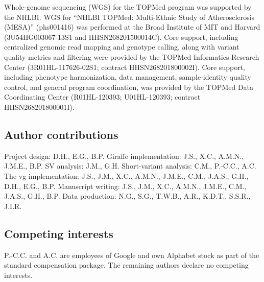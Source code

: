 \documentclass[11pt]{ucscthesis}
\begin{document}
Whole-genome sequencing (WGS) for the TOPMed program was supported by the NHLBI.
WGS for “NHLBI TOPMed: Multi-Ethnic Study of Atherosclerosis (MESA)” (phs001416) was performed at the Broad Institute of MIT and Harvard (3U54HG003067-13S1 and HHSN268201500014C).
Core support, including centralized genomic read mapping and genotype calling, along with variant quality metrics and filtering were provided by the TOPMed Informatics Research Center (3R01HL-117626-02S1; contract HHSN268201800002I).
Core support, including phenotype harmonization, data management, sample-identity quality control, and general program coordination, was provided by the TOPMed Data Coordinating Center (R01HL-120393; U01HL-120393; contract \\ HHSN268201800001I).

\subsection{Author contributions}
Project design: D.H., E.G., B.P. Giraffe implementation: J.S., X.C., A.M.N., J.M.E., B.P. SV analysis: J.M., G.H. Short-variant analysis: C.M., P.-C.C., A.C. The vg implementation: J.S., J.M., X.C., A.M.N., J.M.E., C.M., J.A.S., G.H., D.H., E.G., B.P. Manuscript writing: J.S., J.M., X.C., A.M.N., J.M.E., C.M., J.A.S., G.H., B.P. Data production: N.G., S.G., T.W.B., A.R., K.D.T., S.S.R., J.I.R.

\subsection{Competing interests}
 P.-C.C. and A.C. are employees of Google and own Alphabet stock as part of the standard compensation package. The remaining authors declare no competing interests.
\end{document}
